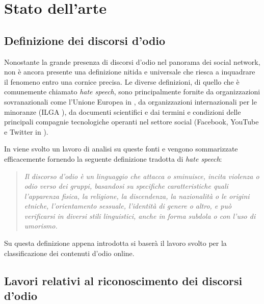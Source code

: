 \chapter{Stato dell'arte}
\hspace{0,5cm}

\section{Definizione dei discorsi d'odio}
Nonostante la grande presenza di discorsi d'odio nel panorama dei social network, non è ancora presente una definizione nitida e universale che riesca a inquadrare il fenomeno entro una cornice precisa. Le diverse definizioni, di quello che è comunemente chiamato \textit{hate speech}, sono principalmente fornite da organizzazioni sovranazionali come l'Unione Europea in \cite{hatespeechEU}, da organizzazioni internazionali per le minoranze (ILGA \cite{ilga}), da documenti scientifici e dai termini e condizioni delle principali compagnie tecnologiche operanti nel settore social (Facebook, YouTube e Twitter in \cite{facebookhate,youtubehate,twitterhate}).

In \cite{survey2} viene svolto un lavoro di analisi su queste fonti e vengono sommarizzate efficacemente fornendo la seguente definizione tradotta di \textit{hate speech}:

\begin{quote}
    \textit{Il discorso d'odio è un linguaggio che attacca o sminuisce, incita violenza o odio verso dei gruppi, basandosi su specifiche caratteristiche quali l'apparenza fisica, la religione, la discendenza, la nazionalità o le origini etniche, l'orientamento sessuale, l'identità di genere o altro, e può verificarsi in diversi stili linguistici, anche in forma subdola o con l'uso di umorismo.}
\end{quote}

Su questa definizione appena introdotta si baserà il lavoro svolto per la classificazione dei contenuti d'odio online.



\section{Lavori relativi al riconoscimento dei discorsi d'odio}

